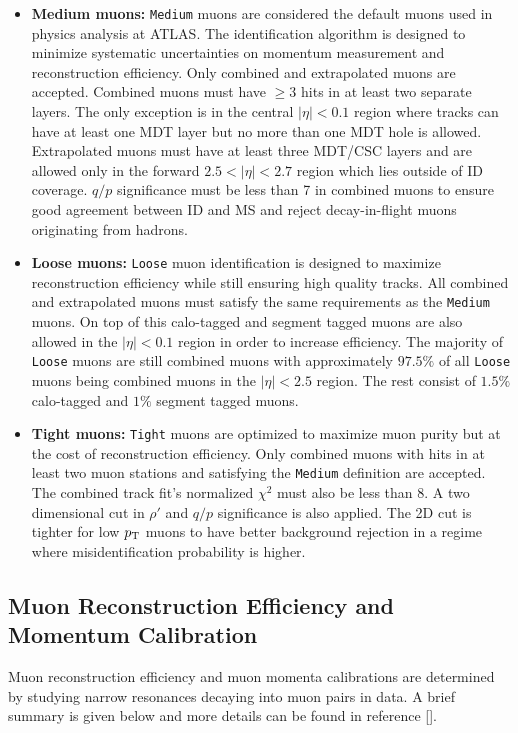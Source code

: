 \begin{itemize}
\item[] {\bf Medium muons:} {\tt Medium} muons are considered the default muons used in physics analysis at ATLAS.  The identification algorithm is designed to minimize systematic uncertainties on momentum measurement and reconstruction efficiency.  Only combined and extrapolated muons are accepted.  Combined muons must have $\ge 3$ hits in at least two separate layers.  The only exception is in the central $|\eta|<0.1$ region where tracks can have at least one MDT layer but no more than one MDT hole is allowed.  Extrapolated muons must have at least three MDT/CSC layers and are allowed only in the forward $2.5 < |\eta| < 2.7$ region which lies outside of ID coverage. $q/p$ significance must be less than 7 in combined muons to ensure good agreement between ID and MS and reject decay-in-flight muons originating from hadrons. 
\item[] {\bf Loose muons:} {\tt Loose} muon identification is designed to maximize reconstruction efficiency while still ensuring high quality tracks. All combined and extrapolated muons must satisfy the same requirements as the {\tt Medium} muons.  On top of this calo-tagged and segment tagged muons are also allowed in the $|\eta|<0.1$ region in order to increase efficiency.  The majority of {\tt Loose} muons are still combined muons with approximately $97.5\%$ of all {\tt Loose} muons being combined muons in the $|\eta|<2.5$ region.  The rest consist of $1.5\%$ calo-tagged and $1\%$ segment tagged muons.
\item[] {\bf Tight muons:} {\tt Tight} muons are optimized to maximize muon purity but at the cost of reconstruction efficiency.  Only combined muons with hits in at least two muon stations and satisfying the {\tt Medium} definition are accepted.  The combined track fit's normalized $\chi^2$ must also be less than 8.  A two dimensional cut in $\rho\prime$ and $q/p$ significance is also applied.  The 2D cut is tighter for low $p_{\mathrm{T}}$ muons to have better background rejection in a regime where misidentification probability is higher.
\end{itemize}

\subsection{Muon Reconstruction Efficiency and Momentum Calibration}
\label{sec:reco:muonEff}

\indent Muon reconstruction efficiency and muon momenta calibrations are determined by studying narrow resonances decaying into muon pairs in data.  A brief summary is given below and more details can be found in reference [\cite{MuonReco}]. \\

